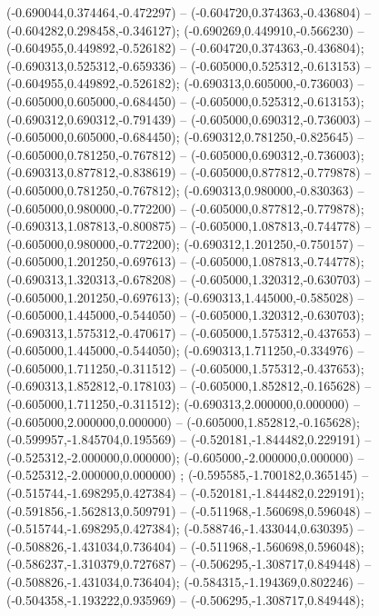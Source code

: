  (-0.690044,0.374464,-0.472297) -- (-0.604720,0.374363,-0.436804) -- (-0.604282,0.298458,-0.346127);
 (-0.690269,0.449910,-0.566230) -- (-0.604955,0.449892,-0.526182) -- (-0.604720,0.374363,-0.436804);
 (-0.690313,0.525312,-0.659336) -- (-0.605000,0.525312,-0.613153) -- (-0.604955,0.449892,-0.526182);
 (-0.690313,0.605000,-0.736003) -- (-0.605000,0.605000,-0.684450) -- (-0.605000,0.525312,-0.613153);
 (-0.690312,0.690312,-0.791439) -- (-0.605000,0.690312,-0.736003) -- (-0.605000,0.605000,-0.684450);
 (-0.690312,0.781250,-0.825645) -- (-0.605000,0.781250,-0.767812) -- (-0.605000,0.690312,-0.736003);
 (-0.690313,0.877812,-0.838619) -- (-0.605000,0.877812,-0.779878) -- (-0.605000,0.781250,-0.767812);
 (-0.690313,0.980000,-0.830363) -- (-0.605000,0.980000,-0.772200) -- (-0.605000,0.877812,-0.779878);
 (-0.690313,1.087813,-0.800875) -- (-0.605000,1.087813,-0.744778) -- (-0.605000,0.980000,-0.772200);
 (-0.690312,1.201250,-0.750157) -- (-0.605000,1.201250,-0.697613) -- (-0.605000,1.087813,-0.744778);
 (-0.690313,1.320313,-0.678208) -- (-0.605000,1.320312,-0.630703) -- (-0.605000,1.201250,-0.697613);
 (-0.690313,1.445000,-0.585028) -- (-0.605000,1.445000,-0.544050) -- (-0.605000,1.320312,-0.630703);
 (-0.690313,1.575312,-0.470617) -- (-0.605000,1.575312,-0.437653) -- (-0.605000,1.445000,-0.544050);
 (-0.690313,1.711250,-0.334976) -- (-0.605000,1.711250,-0.311512) -- (-0.605000,1.575312,-0.437653);
 (-0.690313,1.852812,-0.178103) -- (-0.605000,1.852812,-0.165628) -- (-0.605000,1.711250,-0.311512);
 (-0.690313,2.000000,0.000000) -- (-0.605000,2.000000,0.000000) -- (-0.605000,1.852812,-0.165628);
 (-0.599957,-1.845704,0.195569) -- (-0.520181,-1.844482,0.229191) -- (-0.525312,-2.000000,0.000000);
 (-0.605000,-2.000000,0.000000) -- (-0.525312,-2.000000,0.000000) ;
 (-0.595585,-1.700182,0.365145) -- (-0.515744,-1.698295,0.427384) -- (-0.520181,-1.844482,0.229191);
 (-0.591856,-1.562813,0.509791) -- (-0.511968,-1.560698,0.596048) -- (-0.515744,-1.698295,0.427384);
 (-0.588746,-1.433044,0.630395) -- (-0.508826,-1.431034,0.736404) -- (-0.511968,-1.560698,0.596048);
 (-0.586237,-1.310379,0.727687) -- (-0.506295,-1.308717,0.849448) -- (-0.508826,-1.431034,0.736404);
 (-0.584315,-1.194369,0.802246) -- (-0.504358,-1.193222,0.935969) -- (-0.506295,-1.308717,0.849448);
